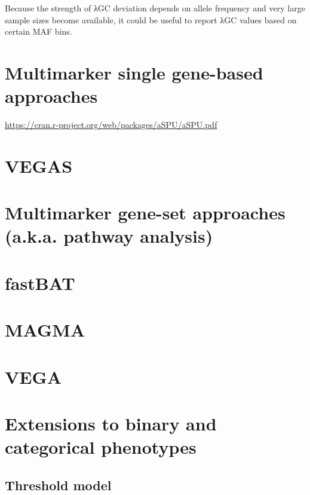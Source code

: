 \documentclass[
]{book}
\begin{document}
Because the strength of λGC deviation depends on allele frequency and very large sample sizes become available, it could be useful to report λGC values based on certain MAF bins.

\hypertarget{multimarker-single-gene-based-approaches}{%
\section{Multimarker single gene-based approaches}\label{multimarker-single-gene-based-approaches}}

\url{https://cran.r-project.org/web/packages/aSPU/aSPU.pdf}

\hypertarget{vegas}{%
\section{VEGAS}\label{vegas}}

\hypertarget{multimarker-gene-set-approaches-a.k.a.-pathway-analysis}{%
\section{Multimarker gene-set approaches (a.k.a. pathway analysis)}\label{multimarker-gene-set-approaches-a.k.a.-pathway-analysis}}

\hypertarget{fastbat}{%
\section{fastBAT}\label{fastbat}}

\hypertarget{magma}{%
\section{MAGMA}\label{magma}}

\hypertarget{vega}{%
\section{VEGA}\label{vega}}

\hypertarget{extensions-to-binary-and-categorical-phenotypes}{%
\section{Extensions to binary and categorical phenotypes}\label{extensions-to-binary-and-categorical-phenotypes}}

\hypertarget{threshold-model}{%
\subsection{Threshold model}\label{threshold-model}}
\end{document}
